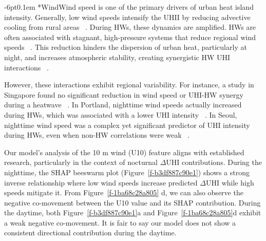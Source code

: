 \documentclass[]{nature}
\makeatletter
\renewcommand{\subsubsection}{\@startsection {subsubsection}{2}{0pt}%
    {-6pt}{0.1em}%
    {\small\sffamily\bfseries\itshape}%
    }
\makeatother
\begin{document}
\subsubsection*{Wind}Wind speed is one of the primary drivers of urban heat island intensity. Generally, low wind speeds intensify the UHII by reducing advective cooling from rural areas\unskip~\cite{2755510:33598893,2755510:33598924,2755510:33598926,2755510:33598952,2755510:33598927,2755510:33598930} . During HWs, these dynamics are amplified. HWs are often associated with stagnant, high-pressure systems that reduce regional wind speeds\unskip~\cite{2755510:33598926} . This reduction hinders the dispersion of urban heat, particularly at night, and increases atmospheric stability, creating synergistic HW UHI interactions\unskip~\cite{2755510:33598950,2755510:33598926,2755510:33598891,2755510:33598941,2755510:33598930} . 

However, these interactions exhibit regional variability. For instance, a study in Singapore found no significant reduction in wind speed or UHI-HW synergy during a heatwave\unskip~\cite{2755510:33598915} . In Portland, nighttime wind speeds actually increased during HWs, which was associated with a lower UHI intensity\unskip~\cite{2755510:33598921} . In Seoul, nighttime wind speed was a complex yet significant predictor of UHI intensity during HWs, even when non-HW correlations were weak\unskip~\cite{2755510:33598952} .

Our model's analysis of the 10 m wind (U10)  feature aligns with established research, particularly in the context of nocturnal \ensuremath{\Delta }UHI contributions. During the nighttime, the SHAP beeswarm plot (Figure~\ref{f-b3df887c90e1}) shows a strong inverse relationship where low wind speeds increase predicted \ensuremath{\Delta }UHI while high speeds mitigate it. From Figure~\ref{f-1ba68c28a805} d, we can also observe the negative co-movement between the U10 value and its SHAP contribution.  During the daytime,  both Figure~\ref{f-b3df887c90e1}a and Figure~\ref{f-1ba68c28a805}d exhibit a weak negative co-movement. It is fair to say our model does not show a consistent directional contribution during the daytime.
\end{document}
